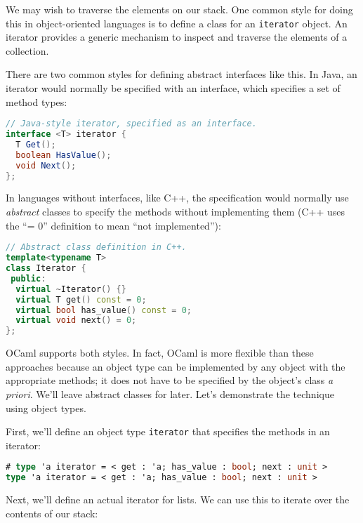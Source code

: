 We may wish to traverse the elements on our stack. One common style for
doing this in object-oriented languages is to define a class for an
\passthrough{\lstinline!iterator!} object. An iterator provides a
generic mechanism to inspect and traverse the elements of a collection.

There are two common styles for defining abstract interfaces like this.
In Java, an iterator would normally be specified with an interface,
which specifies a set of method types:

\begin{lstlisting}[language=Java]
// Java-style iterator, specified as an interface.
interface <T> iterator {
  T Get();
  boolean HasValue();
  void Next();
};
\end{lstlisting}

In languages without interfaces, like C++, the specification would
normally use \emph{abstract} classes to specify the methods without
implementing them (C++ uses the ``= 0'' definition to mean ``not
implemented''):

\begin{lstlisting}[language={C++}]
// Abstract class definition in C++.
template<typename T>
class Iterator {
 public:
  virtual ~Iterator() {}
  virtual T get() const = 0;
  virtual bool has_value() const = 0;
  virtual void next() = 0;
};
\end{lstlisting}

OCaml supports both styles. In fact, OCaml is more flexible than these
approaches because an object type can be implemented by any object with
the appropriate methods; it does not have to be specified by the
object's class \emph{a priori}. We'll leave abstract classes for later.
Let's demonstrate the technique using object types.

First, we'll define an object type \passthrough{\lstinline!iterator!}
that specifies the methods in an iterator:

\begin{lstlisting}[language=Caml]
# type 'a iterator = < get : 'a; has_value : bool; next : unit >
type 'a iterator = < get : 'a; has_value : bool; next : unit >
\end{lstlisting}

Next, we'll define an actual iterator for lists. We can use this to
iterate over the contents of our stack:

